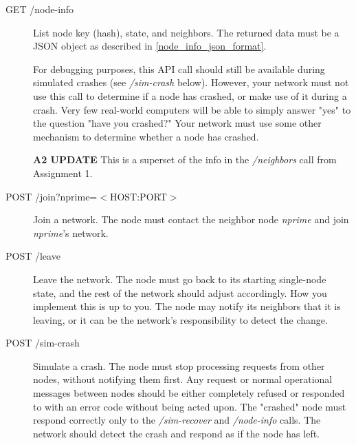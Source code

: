 \documentclass[]{article}
\begin{document}
\begin{description}


    \item[GET /node-info]

        List node key (hash), state, and neighbors.
        The returned data must be a JSON object as described in
        \autoref{node_info_json_format}.

        For debugging purposes, this API call should still be available during
        simulated crashes (see \textit{/sim-crash} below).
        However, your network must not use this call to determine if a node has
        crashed, or make use of it during a crash.
        Very few real-world computers will be able to simply answer "yes" to
        the question "have you crashed?"
        Your network must use some other mechanism to determine whether a node has crashed.


        \textbf{A2 UPDATE}
        This is a superset of the info in the
        \textit{/neighbors} call from Assignment 1.

    \item[POST /join?nprime=$<$HOST:PORT$>$]

        Join a network.
        The node must contact the neighbor node \textit{nprime} and join \textit{nprime}'s network.

    \item[POST /leave]

        Leave the network.
        The node must go back to its starting single-node state,
        and the rest of the network should adjust accordingly.
        How you implement this is up to you.
        The node may notify its neighbors that it is leaving,
        or it can be the network's responsibility to detect the change.

    \item[POST /sim-crash]

        Simulate a crash.
        The node must stop processing requests from other nodes,
        without notifying them first.
        Any request or normal operational messages between nodes should be
        either completely refused or responded to with an error code
        without being acted upon.
        The "crashed" node must respond correctly only to the
        \textit{/sim-recover} and \textit{/node-info} calls.
        The network should detect the crash and respond as if
        the node has left.


\end{description}
\end{document}
